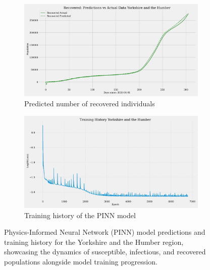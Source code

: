 \documentclass[12pt]{article}
\begin{document}
\begin{figure}
    \begin{subfigure}[t]{0.45\textwidth}
        \includegraphics[width=\textwidth]{images/pinn/R_predictions_Yorkshire and the Humber.pdf}
        \caption{Predicted number of recovered individuals}
        \label{fig:R_predictions_Yorkshire and the Humber}
    \end{subfigure}
    \hfill %
    \begin{subfigure}[t]{0.45\textwidth}
        \centering
        \includegraphics[width=\textwidth]{images/pinn/Training_History_Yorkshire and the Humber.pdf}
        \caption{Training history of the PINN model}
        \label{fig:Training_History_Yorkshire and the Humber}
    \end{subfigure}
    \caption{Physics-Informed Neural Network (PINN) model predictions and training history for the Yorkshire and the Humber region, showcasing the dynamics of susceptible, infectious, and recovered populations alongside model training progression.}
    \label{fig:PINN_Yorkshire and the Humber_Comprehensive}
\end{figure}




\end{document}
